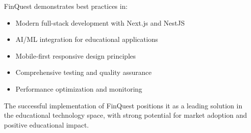 \documentclass[12pt,a4paper]{article}
\begin{document}
FinQuest demonstrates best practices in:
\begin{itemize}
    \item Modern full-stack development with Next.js and NestJS
    \item AI/ML integration for educational applications
    \item Mobile-first responsive design principles
    \item Comprehensive testing and quality assurance
    \item Performance optimization and monitoring
\end{itemize}

The successful implementation of FinQuest positions it as a leading solution in the educational technology space, with strong potential for market adoption and positive educational impact.
\end{document}
